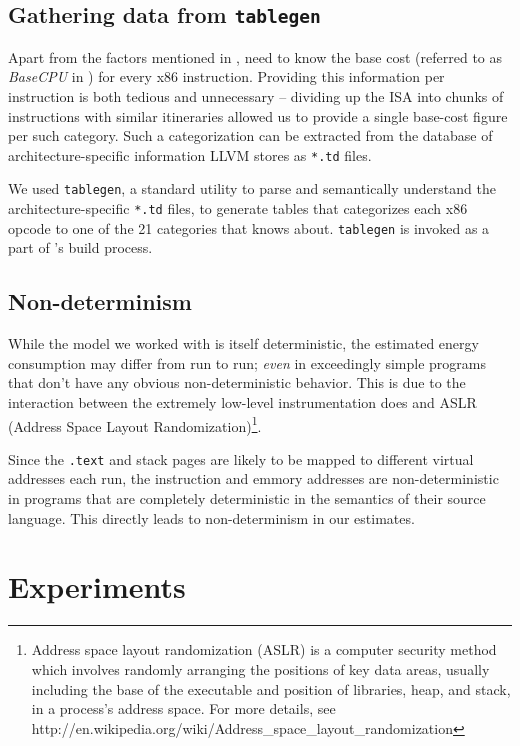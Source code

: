 \subsection{Gathering data from \texttt{tablegen}}

Apart from the factors mentioned in , \wattage need
to know the base cost (referred to as \textit{BaseCPU} in
\cite{steinke}) for every x86 instruction.  Providing this information
per instruction is both tedious and unnecessary -- dividing up the ISA
into chunks of instructions with similar itineraries allowed us to
provide a single base-cost figure per such category.  Such a
categorization can be extracted from the database of
architecture-specific information LLVM stores as \texttt{*.td} files.

We used \texttt{tablegen}, a standard utility to parse and
semantically understand the architecture-specific \texttt{*.td} files,
to generate tables that categorizes each x86 opcode to one of the 21
categories that \wattage knows about.  \texttt{tablegen} is invoked as
a part of \wattage's build process.

\subsection{Non-determinism}

While the model we worked with is itself deterministic, the estimated
energy consumption may differ from run to run; \textit{even} in
exceedingly simple programs that don't have any obvious
non-deterministic behavior.  This is due to the interaction between
the extremely low-level instrumentation \wattage does and ASLR
(Address Space Layout Randomization)\footnote{ Address space layout
  randomization (ASLR) is a computer security method which involves
  randomly arranging the positions of key data areas, usually
  including the base of the executable and position of libraries,
  heap, and stack, in a process's address space.  For more details,
  see
  http://en.wikipedia.org/wiki/Address\_space\_layout\_randomization}.

Since the \texttt{.text} and stack pages are likely to be mapped to
different virtual addresses each run, the instruction and emmory
addresses are non-deterministic in programs that are completely
deterministic in the semantics of their source language.  This
directly leads to non-determinism in our estimates.

\section{Experiments}

